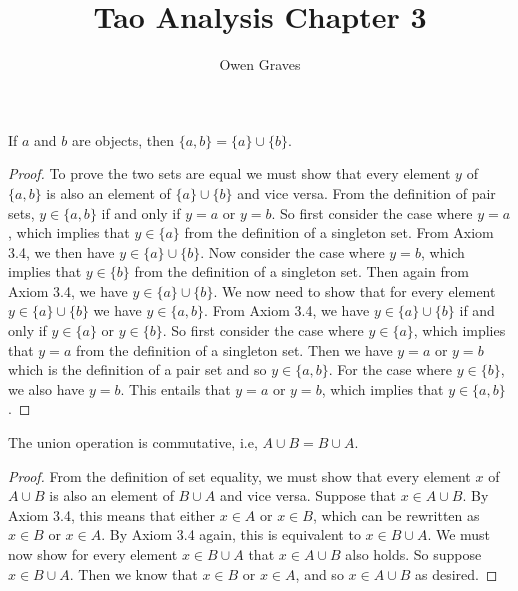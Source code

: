 \documentclass[12pt]{article}
\newenvironment{lemma}[2][Lemma]{\begin{trivlist}
\item[\hskip \labelsep {\bfseries #1}\hskip \labelsep {\bfseries #2}]}{\end{trivlist}}
\begin{document}
\title{Tao Analysis Chapter 3}
\author{Owen Graves}
\date{}
 
\maketitle
 
\begin{lemma}{3.1.13a}
	If $ a $ and $ b $ are objects, then $ \{a, b\} = \{a\} \cup \{b\} $.
\end{lemma}
\begin{proof}
	To prove the two sets are equal we must show that every element $ y $ of $ \{a, b\} $ is also an element of $ \{a\} \cup \{b\} $ and vice versa.
	From the definition of pair sets, $ y \in \{a, b\} $ if and only if $ y = a $ or $ y = b $.
	So first consider the case where $ y = a $, which implies that $ y \in \{a\} $ from the definition of a singleton set.
	From Axiom 3.4, we then have $ y \in \{a\} \cup \{b\} $.
	Now consider the case where $ y = b $, which implies that $ y \in \{b\} $ from the definition of a singleton set.
	Then again from Axiom 3.4, we have $ y \in \{a\} \cup \{b\} $.
	We now need to show that for every element $ y \in \{a\} \cup \{b\} $ we have $ y \in \{a, b\} $.
	From Axiom 3.4, we have $ y \in \{a\} \cup \{b\} $ if and only if $ y \in \{a\} $ or $ y \in \{b\} $.
	So first consider the case where $ y \in \{a\} $, which implies that $ y = a $ from the definition of a singleton set.
	Then we have $ y = a $ or $ y = b $ which is the definition of a pair set and so $ y \in \{a, b\} $.
	For the case where $ y \in \{b\} $, we also have $ y = b $.
	This entails that $ y = a $ or $ y = b $, which implies that $ y \in \{a, b\} $.
\end{proof}

\begin{lemma}{3.1.13b}
	The union operation is commutative, i.e, $ A \cup B = B \cup A $.
\end{lemma}
\begin{proof}
	From the definition of set equality, we must show that every element $ x $ of $ A \cup B $ is also an element of $ B \cup A $ and vice versa.
	Suppose that $ x \in A \cup B $.
	By Axiom 3.4, this means that either $ x \in A $ or $ x \in B $, which can be rewritten as $ x \in B $ or $ x \in A $.
	By Axiom 3.4 again, this is equivalent to $ x \in B \cup A $.
	We must now show for every element $ x \in B \cup A $ that $ x \in A \cup B $ also holds.
	So suppose $ x \in B \cup A $.
	Then we know that $ x \in B $ or $ x \in A $, and so $ x \in A \cup B $ as desired.
\end{proof}
\end{document}
